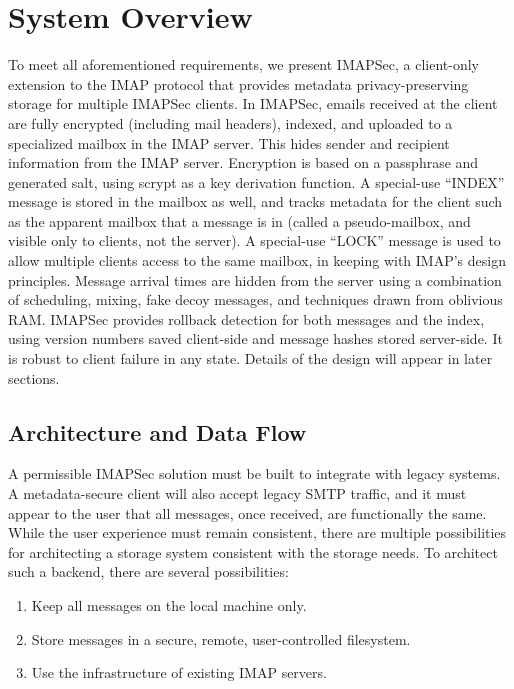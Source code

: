 \documentclass[pageno]{jpaper}
\newcommand{\project}{IMAPSec }
\newcommand{\projectnospace}{IMAPSec}
\begin{document}
\section{System Overview}
To meet all aforementioned requirements, we present \projectnospace, a client-only extension to the IMAP protocol that provides metadata privacy-preserving storage for multiple \project clients. In \projectnospace, emails received at the client are fully encrypted (including mail headers), indexed, and uploaded to a specialized mailbox in the IMAP server. This hides sender and recipient information from the IMAP server. Encryption is based on a passphrase and generated salt, using scrypt as a key derivation function. A special-use ``INDEX'' message is stored in the mailbox as well, and tracks metadata for the client such as the apparent mailbox that a message is in (called a pseudo-mailbox, and visible only to clients, not the server). A special-use ``LOCK'' message is used to allow multiple clients access to the same mailbox, in keeping with IMAP's design principles. Message arrival times are hidden from the server using a combination of scheduling, mixing, fake decoy messages, and techniques drawn from oblivious RAM. \project provides rollback detection for both messages and the index, using version numbers saved client-side and message hashes stored server-side. It is robust to client failure in any state. Details of the design will appear in later sections.

\subsection{Architecture and Data Flow}
\label{architecture}


A permissible \project solution must be built to integrate with legacy systems. A metadata-secure client will also accept legacy SMTP traffic, and it must appear to the user that all messages, once received, are functionally the same. While the user experience must remain consistent, there are multiple possibilities for architecting a storage system consistent with the storage needs. To architect such a backend, there are several possibilities:

\begin{enumerate}
  \item Keep all messages on the local machine only.
    \item Store messages in a secure, remote, user-controlled filesystem.
    \item Use the infrastructure of existing IMAP servers.
\end{enumerate}
\end{document}
